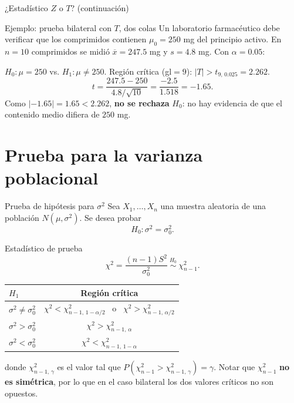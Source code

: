 \documentclass[aspectratio=169,11pt]{beamer}
\begin{document}
\begin{frame}{¿Estadístico $Z$ o $T$? (continuación)}
\begin{exampleblock}{Ejemplo: prueba bilateral con $T$, dos colas}
Un laboratorio farmacéutico debe verificar que los comprimidos contienen $\mu_0=250$ mg del principio activo. En $n=10$ comprimidos se midió $\overline{x}=247.5$ mg y $s=4.8$ mg. Con $\alpha=0.05$:

$H_0:\mu=250$ vs. $H_1:\mu\neq250$. Región crítica (gl$=9$): $|T|>t_{9,\,0.025}=2.262$.
\[
t=\frac{247.5-250}{4.8/\sqrt{10}}=\frac{-2.5}{1.518}=-1.65.
\]
Como $|-1.65|=1.65<2.262$, \textbf{no se rechaza} $H_0$: no hay evidencia de que el contenido medio difiera de $250$ mg.
\end{exampleblock}
\end{frame}

\section{Prueba para la varianza poblacional}

\begin{frame}{Prueba de hipótesis para $\sigma^2$}
Sea $X_1,\dots,X_n$ una muestra aleatoria de una población $N(\mu,\sigma^2)$. Se desea probar
\[
H_0: \sigma^2=\sigma_0^2.
\]

\begin{block}{Estadístico de prueba}
\[
\chi^2 = \frac{(n-1)S^2}{\sigma_0^2} \ \overset{H_0}{\sim}\ \chi^2_{n-1}.
\]
\end{block}

\begin{table}[]
\centering
\small
\begin{tabular}{@{}lc@{}}
\toprule
$H_1$ & Región crítica \\
\midrule
$\sigma^2\neq\sigma_0^2$ & $\chi^2<\chi^2_{n-1,\,1-\alpha/2}$ \ o \ $\chi^2>\chi^2_{n-1,\,\alpha/2}$ \\
$\sigma^2>\sigma_0^2$ & $\chi^2>\chi^2_{n-1,\,\alpha}$ \\
$\sigma^2<\sigma_0^2$ & $\chi^2<\chi^2_{n-1,\,1-\alpha}$ \\
\bottomrule
\end{tabular}
\end{table}
donde $\chi^2_{n-1,\,\gamma}$ es el valor tal que $P(\chi^2_{n-1}>\chi^2_{n-1,\,\gamma})=\gamma$. Notar que $\chi^2_{n-1}$ \textbf{no es simétrica}, por lo que en el caso bilateral los dos valores críticos no son opuestos.
\end{frame}
\end{document}
